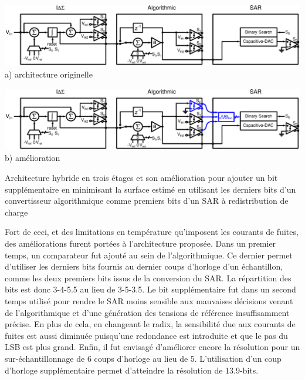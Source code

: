 \begin{mdframed}[linecolor=Prune,linewidth=1]
\begin{center}
    \centering
    \begin{minipage}[b]{\textwidth}
        \centering
        \includegraphics[width=\textwidth]{Chapter4/Figs/architecture-full-principle.ps}
        a) architecture originelle
        \vspace{2em}
    \end{minipage}
    \begin{minipage}[b]{\textwidth}
        \centering
        \includegraphics[width=\textwidth]{Chapter4/Figs/architecture-full-principle-final.ps}
        b) amélioration
    \end{minipage}
	\caption[]{Architecture hybride en trois étages et son amélioration pour ajouter un bit supplémentaire en minimisant la surface estimé en utilisant les derniers bits d'un convertisseur algorithmique comme premiers bits d'un SAR à redistribution de charge}
	\label{fig:final-prop-adc-architecture}
\end{center}
Fort de ceci, et des limitations en température qu'imposent les courants de fuites, des améliorations furent portées à l'architecture proposée. Dans un premier temps, un comparateur fut ajouté au sein de l'algorithmique. Ce dernier permet d'utiliser les derniers bits fournis au dernier coups d'horloge d'un échantillon, comme les deux premiers bits issus de la conversion du SAR\@. La répartition des bits est donc 3-4-5.5 au lieu de 3-5-3.5. Le bit supplémentaire fut dans un second temps utilisé pour rendre le SAR moins sensible aux mauvaises décisions venant de l'algorithmique et d'une génération des tensions de référence insuffisamment précise. En plus de cela, en changeant le radix, la sensibilité due aux courants de fuites est aussi diminuée puisqu'une redondance est introduite et que le pas du LSB est plus grand. Enfin, il fut envisagé d'améliorer encore la résolution pour un sur-échantillonnage de 6 coups d'horloge au lieu de 5. L'utilisation d'un coup d'horloge supplémentaire permet d'atteindre la résolution de 13.9-bits.


\end{mdframed}
